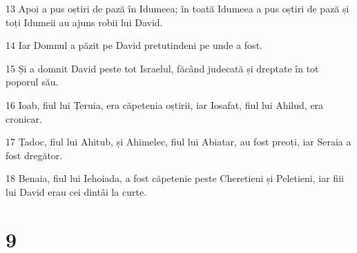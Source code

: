 \par 13 Apoi a pus oștiri de pază în Idumeea; în toată Idumeea a pus oștiri de pază și toți Idumeii au ajuns robii lui David.
\par 14 Iar Domnul a păzit pe David pretutindeni pe unde a fost.
\par 15 Și a domnit David peste tot Israelul, făcând judecată și dreptate în tot poporul său.
\par 16 Ioab, fiul lui Țeruia, era căpetenia oștirii, iar Iosafat, fiul lui Ahilud, era cronicar.
\par 17 Țadoc, fiul lui Ahitub, și Ahimelec, fiul lui Abiatar, au fost preoți, iar Seraia a fost dregător.
\par 18 Benaia, fiul lui Iehoiada, a fost căpetenie peste Cheretieni și Peletieni, iar fiii lui David erau cei dintâi la curte.

\chapter{9}

